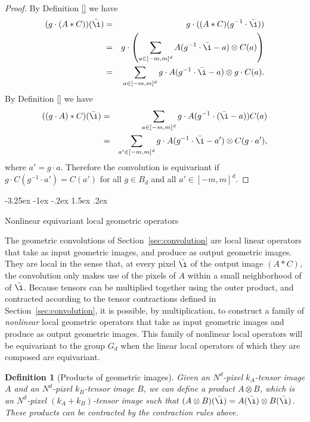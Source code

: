 \documentclass{article}
\makeatletter
\theoremstyle{plain}
\newtheorem{definition}{Definition}
\newcommand{\sectionname}{Section}
\newcommand{\secref}[1]{\sectionname~\ref{#1}}
\renewcommand\section{\@startsection {section}{1}{\z@}%
  {-3.25ex \@plus -1ex \@minus -.2ex}%
  {1.5ex \@plus .2ex}%
  {\raggedright\normalfont\large\bfseries}}
\makeatother
\begin{document}
\begin{proof}
By Definition \ref{} we have
\begin{eqnarray}
(g\cdot (A* C) )(\bar \i) &=& g\cdot( (A*C)(g^{-1} \cdot \bar \i)) \\
&=& g \cdot \left (\sum_{a\in [-m,m]^d} A(g^{-1}\cdot \bar \i - a) \otimes C(a)\right)\\
&=& \sum_{a\in [-m,m]^d} g \cdot A(g^{-1} \cdot \bar \i -a ) \otimes g \cdot C(a).
\end{eqnarray}
By Definition \ref{} we have
\begin{eqnarray}
((g\cdot A)* C) (\bar \i) &=& \sum_{a\in [-m,m]^d} g\cdot A(g^{-1} \cdot (\bar \i - a) ) C(a) \\
&=& \sum_{a'\in [-m,m]^d} g \cdot A(g^{-1}\cdot \bar \i -a') \otimes C(g\cdot a'),
\end{eqnarray}
where $a'=g\cdot a$. Therefore the convolution is equivariant if $g\cdot C(g^{-1} \cdot a') = C(a')$ for all $g\in B_d$ and all $a' \in [-m,m]^d$. 
\end{proof}

\section{Nonlinear equivariant local geometric operators}\label{sec:nonlinear}

The geometric convolutions of \secref{sec:convolution} are local linear operators that take as input geometric images, and produce as output geometric images.
They are local in the sense that, at every pixel $\bar\i$ of the output image $(A\ast C)$, the convolution only makes use of the pixels of $A$ within a small neighborhood of of $\bar\i$.
Because tensors can be multiplied together using the outer product, and contracted according to the tensor contractions defined in \secref{sec:convolution}, it is possible, by multiplication, to construct a family of \emph{nonlinear} local geometric operators that take as input geometric images and produce as output geometric images.
This family of nonlinear local operators will be equivariant to the group $G_d$ when the linear local operators of which they are composed are equivariant.

\begin{definition}[Products of geometric images]
Given an $N^d$-pixel $k_A$-tensor image $A$ and an $N^d$-pixel $k_B$-tensor image $B$, we can define a product $A\otimes B$, which is an $N^d$-pixel $(k_A+k_B)$-tensor image such that $(A\otimes B)(\bar\i)=A(\bar\i)\otimes B(\bar\i)$. These products can be contracted by the contraction rules above.
\end{definition}
\end{document}
